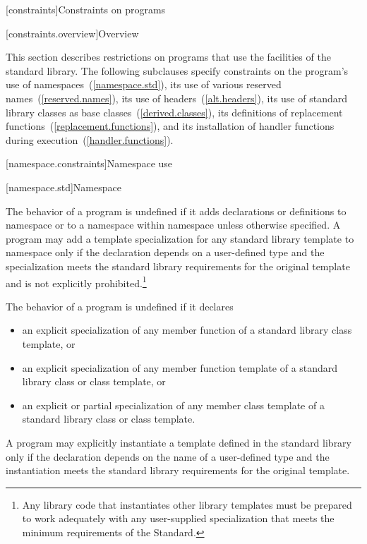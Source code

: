 [constraints]{Constraints on programs}

[constraints.overview]{Overview}

\pnum
This section describes restrictions on \Cpp programs that use the facilities of
the \Cpp standard library. The following subclauses specify constraints on the
program's use of namespaces~(\ref{namespace.std}), its use of various reserved
names~(\ref{reserved.names}), its use of headers~(\ref{alt.headers}), its use of
standard library classes as base classes~(\ref{derived.classes}), its
definitions of replacement functions~(\ref{replacement.functions}), and its
installation of handler functions during execution~(\ref{handler.functions}).

[namespace.constraints]{Namespace use}

[namespace.std]{Namespace }

\pnum
The behavior of a \Cpp program is undefined if it adds declarations or definitions to namespace
or to a namespace within namespace
unless otherwise specified.
A program may add a template specialization for any standard library template
to namespace
 only if the declaration
depends on a user-defined type
and the specialization meets the standard library requirements
for the original template and is not explicitly prohibited.\footnote{Any
library code that instantiates other library templates
must be prepared to work adequately with any user-supplied specialization
that meets the minimum requirements of the Standard.}

\pnum
The behavior of a \Cpp program is undefined if it declares
\begin{itemize}
\item an explicit specialization of any member function of a standard
library class template, or

\item an explicit specialization of any member function template of a
standard library class or class template, or

\item an explicit or partial specialization of any member class template
of a standard library class or class template.
\end{itemize}
A program may explicitly instantiate a template defined in the standard library
only if the declaration depends on the name of a user-defined type
and the instantiation meets the standard library requirements for the
original template.

